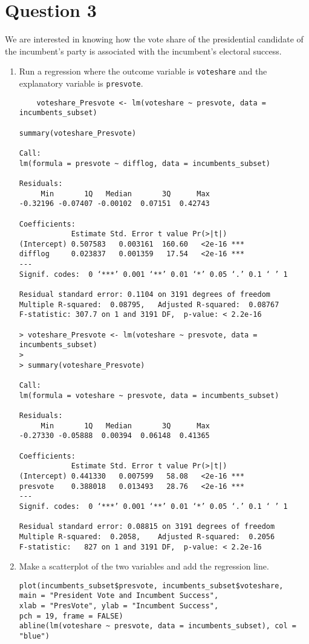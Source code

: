 \documentclass[12pt,letterpaper]{article}
\begin{document}
	\newpage	
\section*{Question 3}

\noindent We are interested in knowing how the vote share of the presidential candidate of the incumbent's party is associated with the incumbent's electoral success.
	\vspace{.25cm}
	\begin{enumerate}
		\item Run a regression where the outcome variable is \texttt{voteshare} and the explanatory variable is \texttt{presvote}.
\begin{verbatim}
    voteshare_Presvote <- lm(voteshare ~ presvote, data = incumbents_subset)

summary(voteshare_Presvote)

Call:
lm(formula = presvote ~ difflog, data = incumbents_subset)

Residuals:
     Min       1Q   Median       3Q      Max 
-0.32196 -0.07407 -0.00102  0.07151  0.42743 

Coefficients:
            Estimate Std. Error t value Pr(>|t|)    
(Intercept) 0.507583   0.003161  160.60   <2e-16 ***
difflog     0.023837   0.001359   17.54   <2e-16 ***
---
Signif. codes:  0 ‘***’ 0.001 ‘**’ 0.01 ‘*’ 0.05 ‘.’ 0.1 ‘ ’ 1

Residual standard error: 0.1104 on 3191 degrees of freedom
Multiple R-squared:  0.08795,	Adjusted R-squared:  0.08767 
F-statistic: 307.7 on 1 and 3191 DF,  p-value: < 2.2e-16

> voteshare_Presvote <- lm(voteshare ~ presvote, data = incumbents_subset)
> 
> summary(voteshare_Presvote)

Call:
lm(formula = voteshare ~ presvote, data = incumbents_subset)

Residuals:
     Min       1Q   Median       3Q      Max 
-0.27330 -0.05888  0.00394  0.06148  0.41365 

Coefficients:
            Estimate Std. Error t value Pr(>|t|)    
(Intercept) 0.441330   0.007599   58.08   <2e-16 ***
presvote    0.388018   0.013493   28.76   <2e-16 ***
---
Signif. codes:  0 ‘***’ 0.001 ‘**’ 0.01 ‘*’ 0.05 ‘.’ 0.1 ‘ ’ 1

Residual standard error: 0.08815 on 3191 degrees of freedom
Multiple R-squared:  0.2058,	Adjusted R-squared:  0.2056 
F-statistic:   827 on 1 and 3191 DF,  p-value: < 2.2e-16
\end{verbatim}
		\item Make a scatterplot of the two variables and add the regression line. 
\begin{verbatim}
plot(incumbents_subset$presvote, incumbents_subset$voteshare, 
main = "President Vote and Incumbent Success",
xlab = "PresVote", ylab = "Incumbent Success",
pch = 19, frame = FALSE)
abline(lm(voteshare ~ presvote, data = incumbents_subset), col = "blue")


\end{verbatim}
\end{enumerate}
\end{document}
